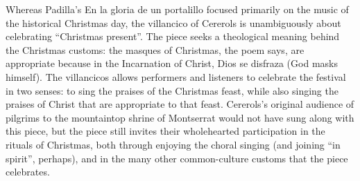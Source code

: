 \documentclass{memoir}
\begin{document}
{{{{{{{{      Whereas Padilla’s En la gloria de un portalillo focused primarily on the music of the historical Christmas day, the villancico of Cererols is unambiguously about celebrating \enquote{Christmas present}.
      The piece seeks a theological meaning behind the Christmas customs: the masques of Christmas, the poem says, are appropriate because in the Incarnation of Christ, Dios se disfraza (God masks himself).
      The villancicos allows performers and listeners to celebrate the festival in two senses: to sing the praises of the Christmas feast, while also singing the praises of Christ that are appropriate to that feast.
      Cererols’s original audience of pilgrims to the mountaintop shrine of Montserrat would not have sung along with this piece, but the piece still invites their wholehearted participation in the rituals of Christmas, both through enjoying the choral singing (and joining \enquote{in spirit}, perhaps), and in the many other common-culture customs that the piece celebrates.
    
}}}}}}}}
\end{document}
